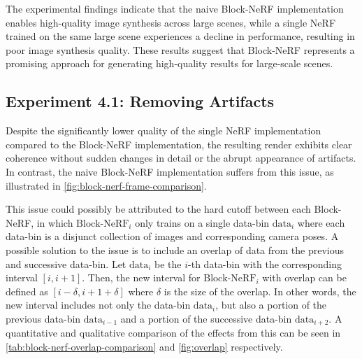 The experimental findings indicate that the naive Block-NeRF implementation enables high-quality image synthesis across large scenes, while a single NeRF trained on the same large scene experiences a decline in performance, resulting in poor image synthesis quality. These results suggest that Block-NeRF represents a promising approach for generating high-quality results for large-scale scenes.

\subsection{Experiment 4.1: Removing Artifacts}
Despite the significantly lower quality of the single NeRF implementation compared to the Block-NeRF implementation, the resulting render exhibits clear coherence without sudden changes in detail or the abrupt appearance of artifacts. In contrast, the naive Block-NeRF implementation suffers from this issue, as illustrated in \autoref{fig:block-nerf-frame-comparison}.



This issue could possibly be attributed to the hard cutoff between each Block-NeRF, in which $\text{Block-NeRF}_i$ only trains on a single data-bin $\text{data}_i$ where each data-bin is a disjunct collection of images and corresponding camera poses. A possible solution to the issue is to include an overlap of data from the previous and successive data-bin. Let $\text{data}_i$ be the $i$-th data-bin with the corresponding interval $[i, {i+1}]$. Then, the new interval for $\text{Block-NeRF}_i$ with overlap can be defined as $[i - \delta, {i+1} + \delta]$ where $\delta$ is the size of the overlap. In other words, the new interval includes not only the data-bin $\text{data}_i$, but also a portion of the previous data-bin $\text{data}_{i-1}$ and a portion of the successive data-bin $\text{data}_{i+2}$. A quantitative and qualitative comparison of the effects from this can be seen in \autoref{tab:block-nerf-overlap-comparison} and \autoref{fig:overlap} respectively.


